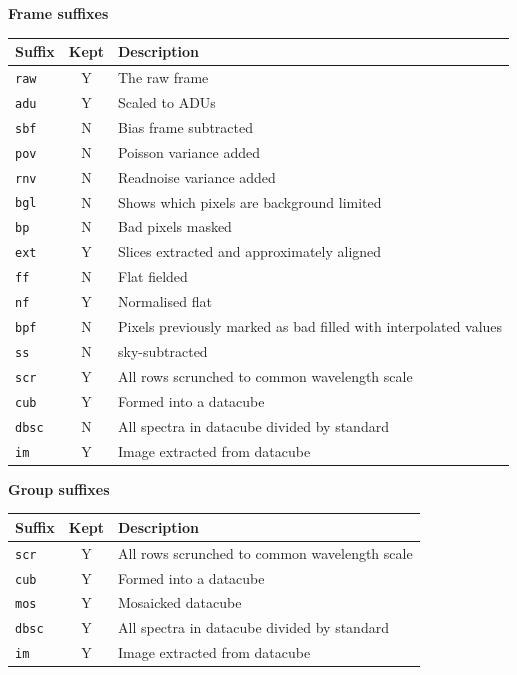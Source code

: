 \documentclass[twoside,11pt]{article}
\renewcommand{\_}{\texttt{\symbol{95}}}
\begin{document}
\textbf{Frame suffixes}

\vspace{0.2cm}

\begin{tabular}{l c l}
\hline
Suffix & Kept & Description \hspace{9cm}  \\
\hline
{\tt \_raw} & Y & The raw frame\\
{\tt \_adu} & Y & Scaled to ADUs\\
{\tt \_sbf} & N & Bias frame subtracted\\
{\tt \_pov} & N & Poisson variance added\\
{\tt \_rnv} & N & Readnoise variance added\\
{\tt \_bgl} & N & Shows which pixels are background limited\\
{\tt \_bp}  & N & Bad pixels masked\\
{\tt \_ext} & Y & Slices extracted and approximately aligned\\
{\tt \_ff}  & N & Flat fielded\\
{\tt \_nf}  & Y & Normalised flat\\
{\tt \_bpf} & N & Pixels previously marked as bad filled with
interpolated values\\
{\tt \_ss}  & N & sky-subtracted\\
{\tt \_scr} & Y & All rows scrunched to common wavelength scale\\
{\tt \_cub} & Y & Formed into a datacube\\
{\tt \_dbsc} & N & All spectra in datacube divided by standard\\
{\tt \_im}  & Y & Image extracted from datacube\\
\hline 
\end{tabular}   

\vspace{0.5cm}

\textbf{Group suffixes}

\vspace{0.2cm}

\begin{tabular}{l c l}
\hline
Suffix & Kept & Description \hspace{9cm} \\
\hline
{\tt \_scr} & Y & All rows scrunched to common wavelength scale\\
{\tt \_cub} & Y & Formed into a datacube\\
{\tt \_mos} & Y & Mosaicked datacube\\
{\tt \_dbsc} & Y & All spectra in datacube divided by standard\\
{\tt \_im}  & Y & Image extracted from datacube\\
\hline 
\end{tabular} 
\end{document}
